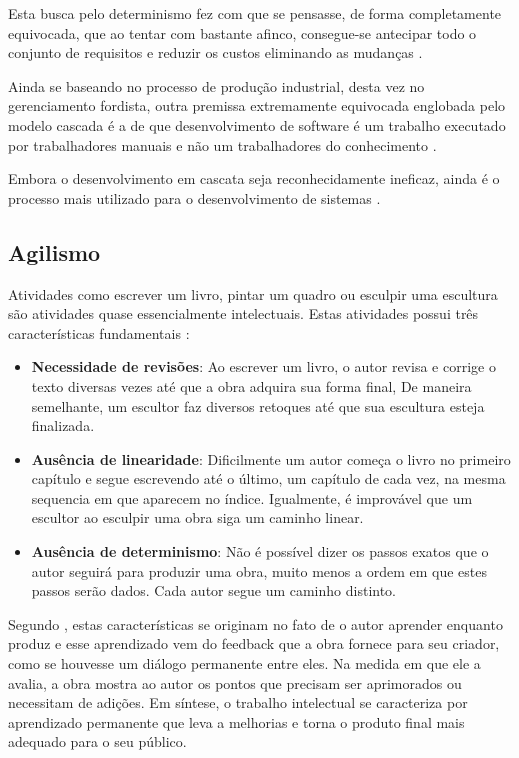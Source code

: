 Esta busca pelo determinismo fez com que se pensasse, de forma completamente equivocada, que ao tentar com bastante afinco, consegue-se antecipar todo o conjunto de requisitos e reduzir os custos eliminando as mudanças \cite{TheBusinessOfInnovation}.

Ainda se baseando no processo de produção industrial, desta vez no gerenciamento fordista, outra premissa extremamente equivocada englobada pelo modelo cascada é a de que desenvolvimento de software é um trabalho executado por trabalhadores manuais e não um trabalhadores do conhecimento \cite[38]{XPTeles}.

Embora o desenvolvimento em cascata seja reconhecidamente ineficaz, ainda é o processo mais utilizado para o desenvolvimento de sistemas \cite{XPTeles}.



\subsection{Agilismo} %
\label{sub:agilismo}

Atividades como escrever um livro, pintar um quadro ou esculpir uma escultura são atividades quase essencialmente intelectuais. Estas atividades possui três características fundamentais \cite{XPTeles}:

\begin{itemize}
  \item \textbf{Necessidade de revisões}: Ao escrever um livro, o autor revisa e corrige o texto diversas vezes até que a obra adquira sua forma final, De maneira semelhante, um escultor faz diversos retoques até que sua escultura esteja finalizada.
  \item \textbf{Ausência de linearidade}: Dificilmente um autor começa o livro no primeiro capítulo e segue escrevendo até o último, um capítulo de cada vez, na mesma sequencia em que aparecem no índice. Igualmente, é improvável que um escultor ao esculpir uma obra siga um caminho linear.
  \item \textbf{Ausência de determinismo}: Não é possível dizer os passos exatos que o autor seguirá para produzir uma obra, muito menos a ordem em que estes passos serão dados. Cada autor segue um caminho distinto.
\end{itemize}

Segundo , estas características se originam no fato de o autor aprender enquanto produz e esse aprendizado vem do feedback que a obra fornece para seu criador, como se houvesse um diálogo permanente entre eles. Na medida em que ele a avalia, a obra mostra ao autor os pontos que precisam ser aprimorados ou necessitam de adições. Em síntese, o trabalho intelectual se caracteriza por aprendizado  permanente que leva a melhorias e torna o produto final mais adequado para o seu público.

